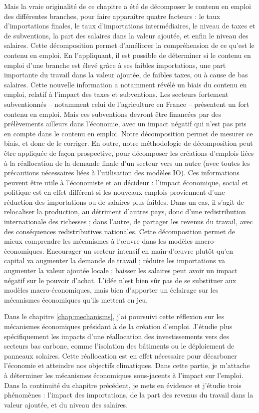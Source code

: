 Mais la vraie originalité de ce chapitre a été de décomposer le contenu en emploi des différentes branches, pour faire apparaître quatre facteurs : le taux d’importations finales, le taux d’importations intermédiaires, le niveau de taxes et de subventions, la part des salaires dans la valeur ajoutée, et enfin le niveau des salaires.
Cette décomposition permet d’améliorer la compréhension de ce qu’est le contenu en emploi. En l’appliquant, il est possible de déterminer si le contenu en emploi d’une branche est élevé grâce à ses faibles importations, une part importante du travail dans la valeur ajoutée, de faibles taxes, ou à cause de bas salaires.
Cette nouvelle information a notamment révélé un biais du contenu en emploi, relatif à l’impact des taxes et subventions. Les secteurs fortement subventionnés -- notamment celui de l'agriculture en France -- présentent un fort contenu en emploi. Mais ces subventions devront être financées par des prélèvements ailleurs dans l’économie, avec un impact négatif qui n’est pas pris en compte dans le contenu en emploi. Notre décomposition permet de mesurer ce biais, et donc de le corriger. 
En outre, notre méthodologie de décomposition peut être appliquée de façon prospective, pour décomposer les créations d’emplois liées à la réallocation de la demande finale d’un secteur vers un autre (avec toutes les précautions nécessaires liées à l’utilisation des modèles IO). Ces informations peuvent être utile à l’économiste et au décideur : l’impact économique, social et politique est en effet différent si les nouveaux emplois proviennent d’une réduction des importations ou de salaires plus faibles. Dans un cas, il s’agit de relocaliser la production, au détriment d’autres pays, donc d’une redistribution internationale des richesses ; dans l’autre, de partager les revenus du travail, avec des conséquences redistributives nationales.
Cette décomposition permet de mieux comprendre les mécanismes à l’œuvre dans les modèles macro-économiques. Encourager un secteur intensif en main-d’œuvre plutôt qu’en capital va augmenter la demande de travail ; réduire les importations va augmenter la valeur ajoutée locale ; baisser les salaires peut avoir un impact négatif sur le pouvoir d’achat. L’idée n’est bien sûr pas de se substituer aux modèles macro-économiques, mais bien d’apporter un éclairage sur les mécanismes économiques qu’ils mettent en jeu.



Dans le chapitre \ref{chap:mechanisms}, j’ai poursuivi cette réflexion sur les mécanismes économiques présidant à de la création d’emploi. J’étudie plus spécifiquement les impacts d’une réallocation des investissements vers des secteurs bas carbone, comme l’isolation des bâtiments ou le déploiement de panneaux solaires.  Cette réallocation est en effet nécessaire pour décarboner l’économie et atteindre nos objectifs climatiques. 
Dans cette partie, je m’attache à déterminer les mécanismes économiques sous-jacents à l’impact sur l’emploi. Dans la continuité du chapitre précédent, je mets en évidence et j’étudie trois phénomènes : l’impact des importations, de la part des revenus du travail dans la valeur ajoutée, et du niveau des salaires.

